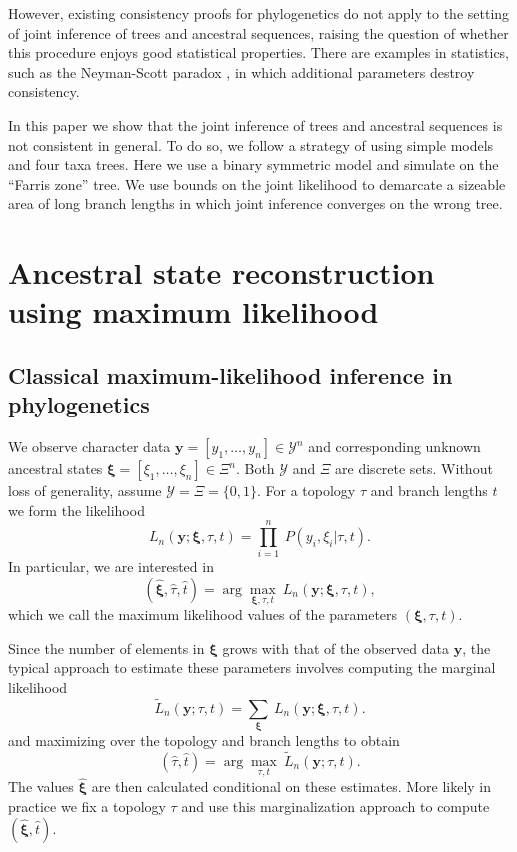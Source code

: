 \documentclass[a4paper]{article}
\begin{document}
However, existing consistency proofs for phylogenetics \cite{ArindamRoyChoudhury?} do not apply to the setting of joint inference of trees and ancestral sequences, raising the question of whether this procedure enjoys good statistical properties.
There are examples in statistics, such as the Neyman-Scott paradox \cite{Neyman1948-tt}, in which additional parameters destroy consistency.

In this paper we show that the joint inference of trees and ancestral sequences is not consistent in general.
To do so, we follow a strategy of using simple models and four taxa trees.
Here we use a binary symmetric model and simulate on the ``Farris zone'' \cite{Siddall1998-hq} tree.
We use bounds on the joint likelihood to demarcate a sizeable area of long branch lengths in which joint inference converges on the wrong tree.

\section{Ancestral state reconstruction using maximum likelihood}

\subsection{Classical maximum-likelihood inference in phylogenetics}

We observe character data $\mathbf{y}=[y_1,\ldots,y_n]\in\mathcal{Y}^n$ and corresponding unknown ancestral states $\boldsymbol\xi=[\xi_1,\ldots,\xi_n]\in\Xi^n$.
Both $\mathcal{Y}$ and $\Xi$ are discrete sets.
Without loss of generality, assume $\mathcal{Y}=\Xi=\{0,1\}$.
For a topology $\tau$ and branch lengths $t$ we form the likelihood
\begin{equation}
\label{eq:full_likelihood}
L_n(\mathbf{y};\boldsymbol\xi, \tau, t) = \prod_{i=1}^{n} \ P(y_i, \xi_i | \tau, t).
\end{equation}
In particular, we are interested in
$$
(\hat{\boldsymbol\xi}, \hat{\tau}, \hat{t}) = \arg\max_{\boldsymbol\xi, \tau, t} \ L_n(\mathbf{y};\boldsymbol\xi, \tau, t),
$$
which we call the maximum likelihood values of the parameters $(\boldsymbol\xi, \tau, t)$.

Since the number of elements in $\boldsymbol\xi$ grows with that of the observed data $\mathbf{y}$, the typical approach to estimate these parameters involves computing the marginal likelihood
\begin{equation}
\label{eq:marginal_likelihood}
\tilde{L}_n(\mathbf{y}; \tau, t) = \sum_{\boldsymbol\xi} \ L_n(\mathbf{y};\boldsymbol\xi, \tau, t).
\end{equation}
and maximizing over the topology and branch lengths to obtain
$$
(\hat{\tau}, \hat{t}) = \arg\max_{\tau, t} \  \tilde{L}_n(\mathbf{y}; \tau, t).
$$
The values $\hat{\boldsymbol\xi}$ are then calculated conditional on these estimates.
More likely in practice we fix a topology $\tau$ and use this marginalization approach to compute $(\hat{\boldsymbol\xi}, \hat{t})$.
\end{document}
